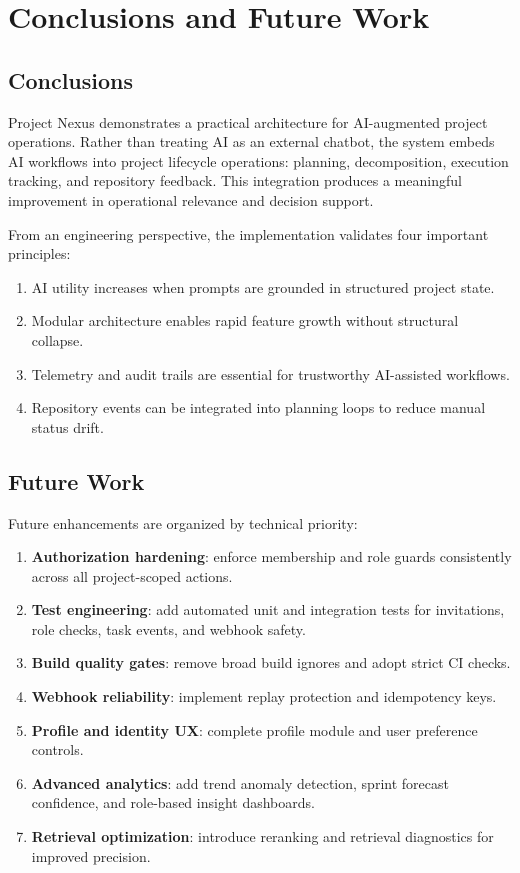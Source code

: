 \documentclass[a4paper, 11pt, oneside]{Dissertation}
\begin{document}
\FloatBarrier

\chapter{Conclusions and Future Work}
\label{ch:conclude}

\section{Conclusions}
Project Nexus demonstrates a practical architecture for AI-augmented project operations. Rather than treating AI as an external chatbot, the system embeds AI workflows into project lifecycle operations: planning, decomposition, execution tracking, and repository feedback. This integration produces a meaningful improvement in operational relevance and decision support.

From an engineering perspective, the implementation validates four important principles:
\begin{enumerate}
\item AI utility increases when prompts are grounded in structured project state.
\item Modular architecture enables rapid feature growth without structural collapse.
\item Telemetry and audit trails are essential for trustworthy AI-assisted workflows.
\item Repository events can be integrated into planning loops to reduce manual status drift.
\end{enumerate}

\section{Future Work}
Future enhancements are organized by technical priority:

\begin{enumerate}
\item \textbf{Authorization hardening}: enforce membership and role guards consistently across all project-scoped actions.
\item \textbf{Test engineering}: add automated unit and integration tests for invitations, role checks, task events, and webhook safety.
\item \textbf{Build quality gates}: remove broad build ignores and adopt strict CI checks.
\item \textbf{Webhook reliability}: implement replay protection and idempotency keys.
\item \textbf{Profile and identity UX}: complete profile module and user preference controls.
\item \textbf{Advanced analytics}: add trend anomaly detection, sprint forecast confidence, and role-based insight dashboards.
\item \textbf{Retrieval optimization}: introduce reranking and retrieval diagnostics for improved precision.
\end{enumerate}
\end{document}
